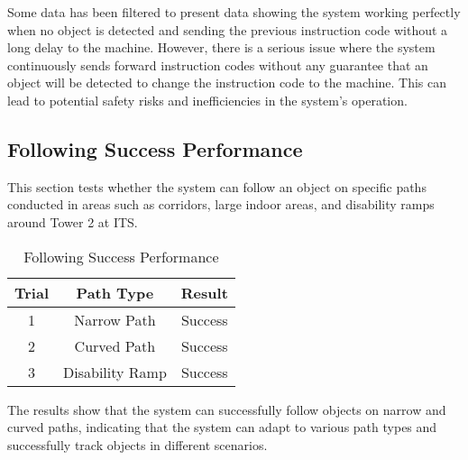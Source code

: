 Some data has been filtered to present data showing the system working perfectly when no object is detected and sending the previous instruction code without a long delay to the machine. However, there is a serious issue where the system continuously sends forward instruction codes without any guarantee that an object will be detected to change the instruction code to the machine. This can lead to potential safety risks and inefficiencies in the system's operation.

\subsection{Following Success Performance}
\label{subsec:followingsuccessperformance}

This section tests whether the system can follow an object on specific paths conducted in areas such as corridors, large indoor areas, and disability ramps around Tower 2 at ITS.

\begin{table}[H]
    \centering
    \caption{Following Success Performance}
    \label{tab:following_success_performance}
    \begin{tabular}{|c|c|c|}
        \hline 
        \cellcolor[HTML]{C0C0C0}Trial & \cellcolor[HTML]{C0C0C0}Path Type & \cellcolor[HTML]{C0C0C0}Result \\ \hline
        1 & Narrow Path & \cellcolor[HTML]{7cFF7c}Success \\ \hline
        2 & Curved Path & \cellcolor[HTML]{7cFF7c}Success \\ \hline
        3 & Disability Ramp & \cellcolor[HTML]{7cFF7c}Success \\ \hline
    \end{tabular}
\end{table}

The results show that the system can successfully follow objects on narrow and curved paths, indicating that the system can adapt to various path types and successfully track objects in different scenarios.